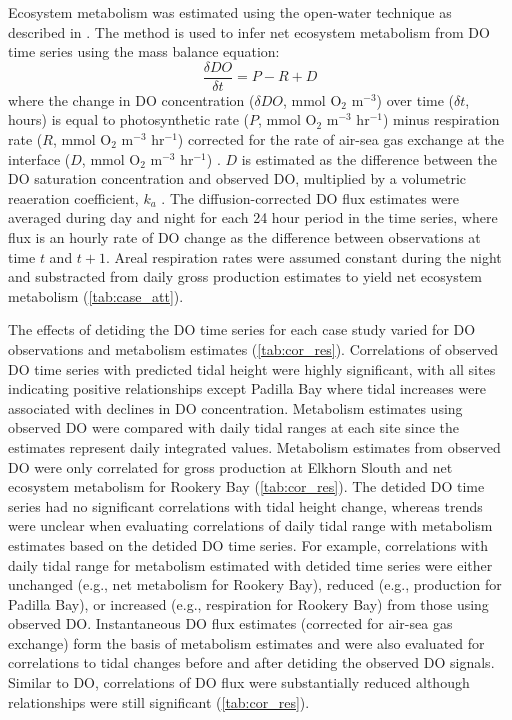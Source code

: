 \documentclass[letterpaper,12pt,oneside]{article}\usepackage[]{graphicx}\usepackage[]{color}
\begin{document}
Ecosystem metabolism was estimated using the open-water technique \citep{Odum56} as described in \citet{Caffrey13}.  The method is used to infer net ecosystem metabolism from \ac{DO} time series using the mass balance equation:
\begin{equation}
\frac{\delta DO}{\delta t} = P - R + D
\end{equation}
where the change in \ac{DO} concentration ($\delta DO$, mmol O$_2$ m$^{-3}$) over time ($\delta t$, hours) is equal to photosynthetic rate ($P$, mmol O$_2$ m$^{-3}$ hr$^{-1}$) minus respiration rate ($R$, mmol O$_2$ m$^{-3}$ hr$^{-1}$) corrected for the rate of air-sea gas exchange at the interface ($D$, mmol O$_2$ m$^{-3}$ hr$^{-1}$) \citep{Caffrey13}. $D$ is estimated as the difference between the \ac{DO} saturation concentration and observed \ac{DO}, multiplied by a volumetric reaeration coefficient, $k_a$ \citep{Thebault08}.  The diffusion-corrected \ac{DO} flux estimates were averaged during day and night for each 24 hour period in the time series, where flux is an hourly rate of \ac{DO} change as the difference between observations at time $t$ and $t+1$.  Areal respiration rates were assumed constant during the night and substracted from daily gross production estimates to yield net ecosystem metabolism (\cref{tab:case_att}).  

The effects of detiding the \ac{DO} time series for each case study varied for \ac{DO} observations and metabolism estimates (\cref{tab:cor_res}).  Correlations of observed \ac{DO} time series with predicted tidal height were highly significant, with all sites indicating positive relationships except Padilla Bay where tidal increases were associated with declines in \ac{DO}  concentration.  Metabolism estimates using observed \ac{DO} were compared with daily tidal ranges at each site since the estimates represent daily integrated values.  Metabolism estimates from observed \ac{DO} were only correlated for gross production at Elkhorn Slouth and net ecosystem metabolism for Rookery Bay (\cref{tab:cor_res}).  The detided \ac{DO} time series had no significant correlations with tidal height change, whereas trends were unclear when evaluating correlations of daily tidal range with metabolism estimates based on the detided \ac{DO} time series.  For example, correlations with daily tidal range for metabolism estimated with detided time series were either unchanged (e.g., net metabolism for Rookery Bay), reduced (e.g., production for Padilla Bay), or increased (e.g., respiration for Rookery Bay) from those using observed \ac{DO}.  Instantaneous \ac{DO} flux estimates (corrected for air-sea gas exchange) form the basis of metabolism estimates and were also evaluated for correlations to tidal changes before and after detiding the observed \ac{DO} signals.  Similar to \ac{DO}, correlations of \ac{DO} flux were substantially reduced although relationships were still significant (\cref{tab:cor_res}).  
\end{document}

